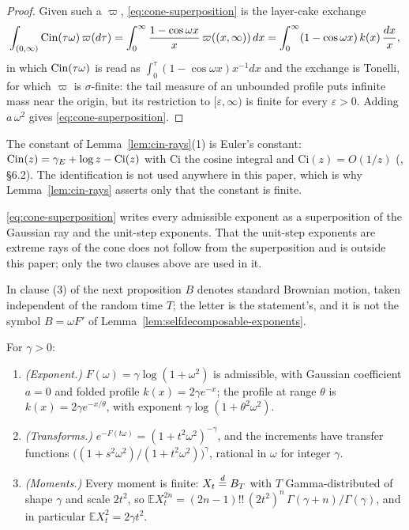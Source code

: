 \begin{proof}
Given such a $\varpi$, \ref{eq:cone-superposition} is the layer-cake exchange
\[
  \int_{(0,\infty)} \operatorname{Cin}(\tau\omega)\,\varpi(d\tau)
  = \int_0^\infty \frac{1 - \cos\omega x}{x}\,\varpi((x,\infty))\,dx
  = \int_0^\infty (1 - \cos\omega x)\,k(x)\,\frac{dx}{x},
\]
in which $\operatorname{Cin}(\tau\omega)$ is read as $\int_0^\tau (1-\cos\omega x)x^{-1}dx$ and the exchange
is Tonelli, for which $\varpi$ is $\sigma$-finite: the tail measure of an unbounded profile
puts infinite mass near the origin, but its restriction to $[\varepsilon,\infty)$ is finite
for every $\varepsilon > 0$. Adding $a\,\omega^2$ gives
\ref{eq:cone-superposition}.
\end{proof}

\begin{remark}\label{rem:cin-constant}
The constant of Lemma~\ref{lem:cin-rays}(1) is Euler's constant: $\operatorname{Cin}(z) = \gamma_E + \log z -
\mathrm{Ci}(z)$ with $\mathrm{Ci}$ the cosine integral and $\mathrm{Ci}(z) = O(1/z)$
(, \S6.2). The identification is not used anywhere in this paper, which is
why Lemma~\ref{lem:cin-rays} asserts only that the constant is finite.
\end{remark}

\ref{eq:cone-superposition} writes every admissible exponent as a superposition of the
Gaussian ray and the unit-step exponents. That the unit-step exponents are extreme rays of
the cone does not follow from the superposition and is outside this paper; only the two
clauses above are used in it.

In clause (3) of the next proposition $B$ denotes standard Brownian motion, taken
independent of the random time $T$; the letter is the statement's, and it is not the symbol
$B = \omega F'$ of Lemma~\ref{lem:selfdecomposable-exponents}.

\begin{proposition}\label{prop:matern-exponent}
For $\gamma > 0$:
\begin{enumerate}
\item \emph{(Exponent.)} $F(\omega) = \gamma\log(1 + \omega^2)$ is admissible, with Gaussian
coefficient $a = 0$ and folded profile $k(x) = 2\gamma e^{-x}$; the profile at range $\theta$ is
$k(x) = 2\gamma e^{-x/\theta}$, with exponent $\gamma\log(1 + \theta^2\omega^2)$.
\item \emph{(Transforms.)} $e^{-F(t\omega)} = (1 + t^2\omega^2)^{-\gamma}$, and the increments
have transfer functions $\bigl((1 + s^2\omega^2)/(1 + t^2\omega^2)\bigr)^{\gamma}$, rational in
$\omega$ for integer $\gamma$.
\item \emph{(Moments.)} Every moment is finite: $X_t \stackrel{d}{=} B_T$ with $T$ Gamma-distributed of
shape $\gamma$ and scale $2t^2$, so
$\mathbb{E}X_t^{2n} = (2n-1)!!\,(2t^2)^n\,\Gamma(\gamma+n)/\Gamma(\gamma)$, and in particular
$\mathbb{E}X_t^2 = 2\gamma t^2$.
\end{enumerate}
\end{proposition}

